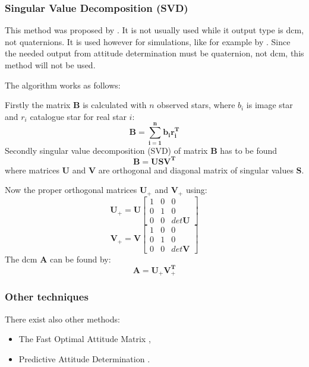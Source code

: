 \documentclass[12pt,a4paper,oneside]{article}
\begin{document}
\subsubsection{Singular Value Decomposition (SVD)}

This method was proposed by \citet{markley1988attitude}. It is not usually used while it output type is \gls{dcm}, not quaternions. It is used however for simulations, like for example by \citet{mcbryde2012star}.
Since the needed output from attitude determination must be quaternion, not \gls{dcm}, this method will not be used.
 
The algorithm works as follows:

Firstly the matrix $\bm{B}$ is calculated with $n$ observed stars, where $b_i$ is image star and $r_i$ catalogue star for real star $i$:
\begin{equation}
\bm{B = \sum_{i=1}^nb_ir_i^T}
\end{equation}
Secondly singular value decomposition (SVD) of matrix $\bm{B}$ has to be found
\begin{equation}
\bm{B = USV^T}
\end{equation}
where matrices $\bm{U}$ and $\bm{V}$ are orthogonal and diagonal matrix of singular values $\bm{S}$.

Now the proper orthogonal matrices $\bm{U}_+$ and $\bm{V}_+$ using:
\begin{equation}
\bm{U}_+ = \bm{U}\begin{bmatrix}
1 & 0 & 0 \\
0 & 1 & 0 \\
0 & 0 & det\bm{U}
\end{bmatrix}
\end{equation}
\begin{equation}
\bm{V}_+ = \bm{V}\begin{bmatrix}
1 & 0 & 0 \\
0 & 1 & 0 \\
0 & 0 & det\bm{V}
\end{bmatrix}
\end{equation}
The \gls{dcm} $\bm{A}$ can be found by:
\begin{equation}
\bm{A = U_+V_+^T}
\end{equation}

\subsubsection{Other techniques}
There exist also other methods:
\begin{itemize}
\item The Fast Optimal Attitude Matrix \cite{markley1993attitude},
\item Predictive Attitude Determination \citet{crassidis1997predictive}.
\end{itemize}
\end{document}
